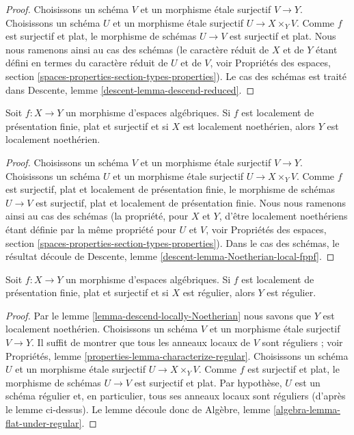 \begin{proof}
Choisissons un schéma $V$ et un morphisme \'etale surjectif $V \to Y$.
Choisissons un schéma $U$ et un morphisme \'etale surjectif
$U \to X \times_Y V$. Comme $f$ est surjectif et plat, le morphisme de
schémas $U \to V$ est surjectif et plat. Nous nous ramenons ainsi
au cas des schémas (le caractère réduit de $X$ et de $Y$ étant défini
en termes du caractère réduit de $U$ et de $V$, voir
Propriétés des espaces,
section \ref{spaces-properties-section-types-properties}).
Le cas des schémas est traité dans
Descente, lemme \ref{descent-lemma-descend-reduced}.
\end{proof}

\begin{lemma}
\label{lemma-descend-locally-Noetherian}
Soit $f : X \to Y$ un morphisme d'espaces algébriques.
Si $f$ est localement de présentation finie, plat et surjectif et si
$X$ est localement noethérien, alors $Y$ est localement noethérien.
\end{lemma}

\begin{proof}
Choisissons un schéma $V$ et un morphisme \'etale surjectif $V \to Y$.
Choisissons un schéma $U$ et un morphisme \'etale surjectif
$U \to X \times_Y V$. Comme $f$ est surjectif, plat et localement de
présentation finie, le morphisme de schémas $U \to V$ est surjectif, plat et
localement de présentation finie. Nous nous ramenons ainsi
au cas des schémas (la propriété, pour $X$ et $Y$, d'être localement noethériens
étant définie par la même propriété pour $U$ et $V$, voir
Propriétés des espaces,
section \ref{spaces-properties-section-types-properties}).
Dans le cas des schémas, le résultat découle de
Descente, lemme \ref{descent-lemma-Noetherian-local-fppf}.
\end{proof}

\begin{lemma}
\label{lemma-descend-regular}
Soit $f : X \to Y$ un morphisme d'espaces algébriques.
Si $f$ est localement de présentation finie, plat et surjectif et si
$X$ est régulier, alors $Y$ est régulier.
\end{lemma}

\begin{proof}
Par
le lemme \ref{lemma-descend-locally-Noetherian}
nous savons que $Y$ est localement noethérien.
Choisissons un schéma $V$ et un morphisme \'etale surjectif $V \to Y$.
Il suffit de montrer que tous les anneaux locaux de $V$ sont réguliers ;
voir
Propriétés, lemme \ref{properties-lemma-characterize-regular}.
Choisissons un schéma $U$ et un morphisme \'etale surjectif
$U \to X \times_Y V$. Comme $f$ est surjectif et plat, le morphisme de schémas
$U \to V$ est surjectif et plat. Par hypothèse, $U$ est un schéma régulier
et, en particulier, tous ses anneaux locaux sont réguliers (d'après le lemme ci-dessus).
Le lemme découle donc de
Algèbre, lemme \ref{algebra-lemma-flat-under-regular}.
\end{proof}

